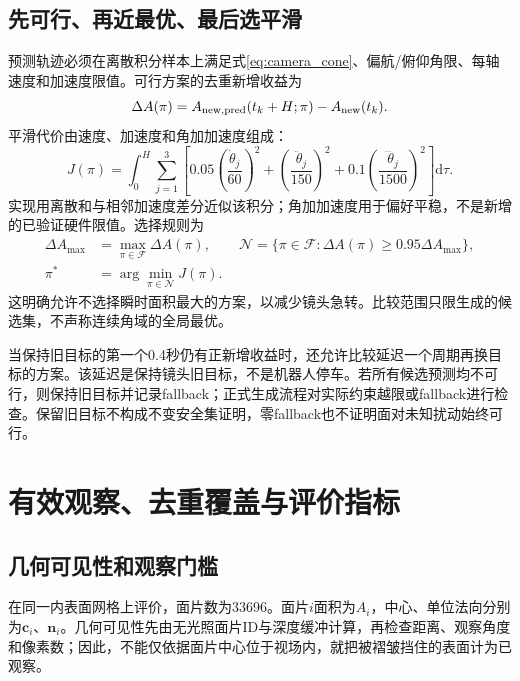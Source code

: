 \documentclass[UTF8,a4paper,zihao=5,fontset=windows]{ctexart}
\newcommand{\vect}[1]{\bm{#1}}
\newcommand{\dd}{\mathrm{d}}
\begin{document}
\subsection{先可行、再近最优、最后选平滑}
预测轨迹必须在离散积分样本上满足式\eqref{eq:camera_cone}、偏航/俯仰角限、每轴速度和加速度限值。可行方案的去重新增收益为
\begin{equation}
\Delta A(\pi)=A_{\rm new,pred}(t_k+H;\pi)-A_{\rm new}(t_k).
\label{eq:predict_gain}
\end{equation}
平滑代价由速度、加速度和角加加速度组成：
\begin{equation}
J(\pi)=\int_0^H\sum_{j=1}^{3}\left[
0.05\left(\frac{\dot\theta_j}{60}\right)^2+\left(\frac{\ddot\theta_j}{150}\right)^2
+0.1\left(\frac{\dddot\theta_j}{1500}\right)^2\right]\dd\tau.
\label{eq:smooth_cost}
\end{equation}
实现用离散和与相邻加速度差分近似该积分；角加加速度用于偏好平稳，不是新增的已验证硬件限值。选择规则为
\begin{align}
\Delta A_{\max}&=\max_{\pi\in\mathcal F}\Delta A(\pi),\qquad
\mathcal N=\{\pi\in\mathcal F:\Delta A(\pi)\ge0.95\Delta A_{\max}\},\\
\pi^*&=\arg\min_{\pi\in\mathcal N}J(\pi).
\label{eq:nearbest}
\end{align}
这明确允许不选择瞬时面积最大的方案，以减少镜头急转。比较范围只限生成的候选集，不声称连续角域的全局最优。

当保持旧目标的第一个0.4秒仍有正新增收益时，还允许比较延迟一个周期再换目标的方案。该延迟是保持镜头旧目标，不是机器人停车。若所有候选预测均不可行，则保持旧目标并记录fallback；正式生成流程对实际约束越限或fallback进行检查。保留旧目标不构成不变安全集证明，零fallback也不证明面对未知扰动始终可行。

\section{有效观察、去重覆盖与评价指标}
\subsection{几何可见性和观察门槛}
在同一内表面网格上评价，面片数为33696。面片$i$面积为$A_i$，中心、单位法向分别为$\vect c_i$、$\vect n_i$。几何可见性先由无光照面片ID与深度缓冲计算，再检查距离、观察角度和像素数；因此，不能仅依据面片中心位于视场内，就把被褶皱挡住的表面计为已观察。
\end{document}
